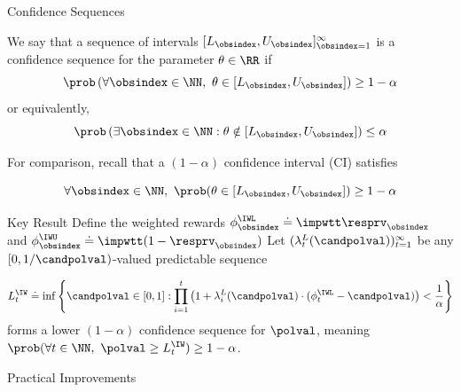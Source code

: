 \documentclass[aspectratio=169, professionalfonts]{beamer}
\begin{document}
\begin{frame}{Confidence Sequences}
	\begin{definition}
		We say that a sequence of intervals $[L_\obsindex, U_\obsindex]_{\obsindex=1}^\infty$ is a confidence sequence for the parameter $\theta \in \RR$ if
		\begin{equation*}\label{eq:cs}
			\prob \left ( \forall \obsindex \in \NN,\ \theta \in [L_\obsindex, U_\obsindex] \right ) \geq 1-\alpha \end{equation*}
		or equivalently,
		\begin{equation*}
			\prob \left ( \exists \obsindex \in \NN : \theta \notin [L_\obsindex, U_\obsindex] \right ) \leq \alpha
		\end{equation*}
	\end{definition}

	\vfill \pause
	For comparison, recall that a $(1- \alpha)$ confidence interval (CI) satisfies

	$$\forall \obsindex \in \NN,\ \prob(\theta \in [L_\obsindex, U_\obsindex]) \geq 1-\alpha$$
\end{frame}

\begin{frame}{Key Result}
	Define the weighted rewards $\phi_\obsindex^\IWL \doteq \impwtt \resprv_\obsindex$ and $\phi_\obsindex^\IWU \doteq
		\impwtt(1-\resprv_\obsindex)$
	\vfill
	Let   $(\lambda_t^L(\candpolval))_{t=1}^\infty$ be any $[0, 1/\candpolval)$-valued
	predictable sequence

	\vfill
	\begin{equation}\label{eq:kmr-cs}
		L_t^\IW \doteq \inf\left \{ \candpolval \in [0, 1] : \prod_{i=1}^t \left ( 1 + \lambda_i^L(\candpolval) \cdot (\phi_t^\IWL - \candpolval) \right ) < \frac{1}{\alpha} \right \}
	\end{equation}
	forms a lower $(1-\alpha)$ confidence sequence for $\polval$, meaning
	\vfill                  \vfill
	$\prob(\forall t \in \NN,\ \polval \geq L_t^\IW) \geq 1-\alpha$.
\end{frame}

\begin{frame}{Practical Improvements}

\end{frame}
\end{document}
